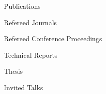
\begin{rSection}{Publications}
  \begin{rSubsection}{Refereed Journals}{}{}{}
    \printbibliography[keyword=journal,heading=none]
  \end{rSubsection}
  \begin{rSubsection}{Refereed Conference Proceedings}{}{}{}
    \printbibliography[keyword=proceeding,heading=none]
  \end{rSubsection}
  \begin{rSubsection}{Technical Reports}{}{}{}
    \printbibliography[keyword=techReport,heading=none]
  \end{rSubsection}
  \begin{rSubsection}{Thesis}{}{}{}
    \printbibliography[keyword=thesis,heading=none]
  \end{rSubsection}
  \begin{rSubsection}{Invited Talks}{}{}{}
    \printbibliography[keyword=invitedTalk,heading=none]
  \end{rSubsection}
\end{rSection}
